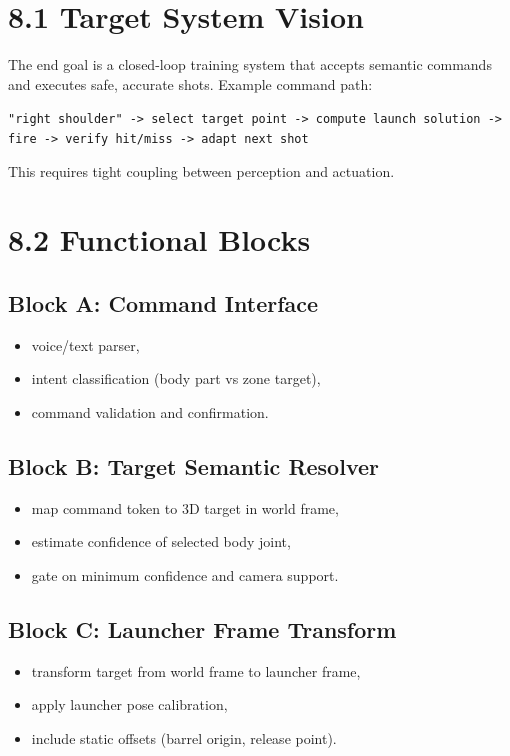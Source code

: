 \section{8.1 Target System Vision}
The end goal is a closed-loop training system that accepts semantic commands and executes safe, accurate shots. Example command path:

\texttt{"right shoulder" -> select target point -> compute launch solution -> fire -> verify hit/miss -> adapt next shot}

This requires tight coupling between perception and actuation.

\section{8.2 Functional Blocks}
\subsection{Block A: Command Interface}
\begin{itemize}
  \item voice/text parser,
  \item intent classification (body part vs zone target),
  \item command validation and confirmation.
\end{itemize}

\subsection{Block B: Target Semantic Resolver}
\begin{itemize}
  \item map command token to 3D target in world frame,
  \item estimate confidence of selected body joint,
  \item gate on minimum confidence and camera support.
\end{itemize}

\subsection{Block C: Launcher Frame Transform}
\begin{itemize}
  \item transform target from world frame to launcher frame,
  \item apply launcher pose calibration,
  \item include static offsets (barrel origin, release point).
\end{itemize}

